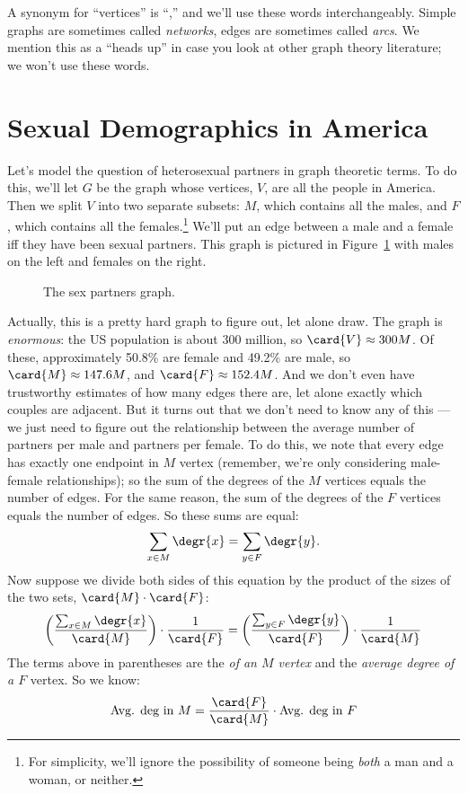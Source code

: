 A synonym for ``vertices'' is ``,'' and we'll use these
words interchangeably.  Simple graphs are sometimes
called \emph{networks}, edges are sometimes called \emph{arcs}.  We
mention this as a ``heads up'' in case you look at other graph theory
literature; we won't use these words.

\section{Sexual Demographics in America}\label{sexam}

Let's model the question of heterosexual partners in graph theoretic
terms.  To do this, we'll let $G$ be the graph whose vertices, $V$,
are all the people in America.  Then we split $V$ into two separate
subsets: $M$, which contains all the males, and $F$, which contains
all the females.\footnote{For simplicity, we'll ignore the possibility
  of someone being \emph{both} a man and a woman, or neither.}  We'll
put an edge between a male and a female iff they have been sexual
partners.  This graph is pictured in Figure~\ref{fig:partners} with
males on the left and females on the right.

\begin{figure}
\caption{The sex partners graph.}
\label{fig:partners}
\end{figure}

Actually, this is a pretty hard graph to figure out, let alone draw.
The graph is \emph{enormous}: the US population is about 300 million,
so $\card{V} \approx 300M$.  Of these, approximately 50.8\% are female
and 49.2\% are male, so $\card{M} \approx 147.6M$, and
$\card{F} \approx 152.4M$.  And we don't even have trustworthy
estimates of how many edges there are, let alone exactly which couples
are adjacent.  But it turns out that we don't need to know any of this
---we just need to figure out the relationship between the average
number of partners per male and partners per female.  To do this, we
note that every edge has exactly one endpoint in $M$ vertex (remember,
we're only considering male-female relationships); so the sum of the
degrees of the $M$ vertices equals the number of edges.  For the same
reason, the sum of the degrees of the $F$ vertices equals the number
of edges.  So these sums are equal:
%
\[
\sum_{x \in M} \degr{x} = \sum_{y \in F} \degr{y}.
\]
%
Now suppose we divide both sides of this equation by the product of the sizes of the
two sets, $\card{M} \cdot \card{F}$:
%
\[
\left(\frac{\sum_{x \in M} \degr{x}}{\card{M}}\right) \cdot \frac{1}{\card{F}} =
\left(\frac{\sum_{y \in F} \degr{y}}{\card{F}}\right) \cdot \frac{1}{\card{M}}
\]
%
The terms above in parentheses are the \emph{ of an $M$ vertex} and
  the \emph{average degree of a $F$} vertex.  So we know:
\begin{equation}\label{avgsexMF}
\text{Avg. deg in $M$} = \frac{\card{F}}{\card{M}} \cdot \text{Avg. deg in $F$}
\end{equation}

